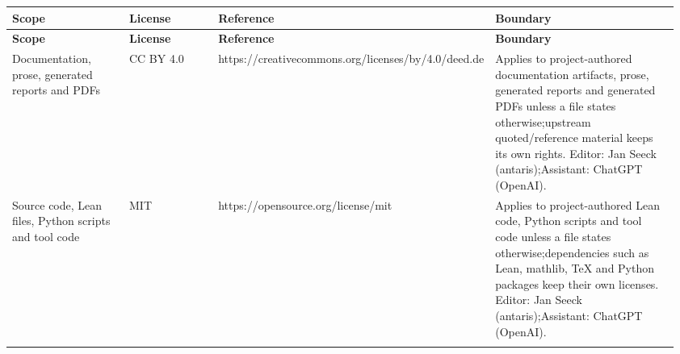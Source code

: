 \footnotesize
{}
\begin{longtable}{L{0.21\linewidth} L{0.185\linewidth} L{0.22\linewidth} L{0.35\linewidth}}
\hline
\textbf{Scope} & \textbf{License} & \textbf{Reference} & \textbf{Boundary}\\
\hline
\endfirsthead
\hline
\textbf{Scope} & \textbf{License} & \textbf{Reference} & \textbf{Boundary}\\
\hline
\endhead
Documentation, prose, generated reports and PDFs & CC BY 4.0 & https:/\allowbreak{}/\allowbreak{}creativecommons.org/\allowbreak{}licenses/\allowbreak{}by/\allowbreak{}4.0/\allowbreak{}deed.de & Applies to project-authored documentation artifacts, prose, generated reports and generated PDFs unless a file states otherwise;\newline upstream quoted/\allowbreak{}reference material keeps its own rights. Editor: Jan Seeck (antaris);\newline Assistant: ChatGPT (OpenAI).\\
\hline
\addlinespace[0.24em]
Source code, Lean files, Python scripts and tool code & MIT & https:/\allowbreak{}/\allowbreak{}opensource.org/\allowbreak{}license/\allowbreak{}mit & Applies to project-authored Lean code, Python scripts and tool code unless a file states otherwise;\newline dependencies such as Lean, mathlib, TeX and Python packages keep their own licenses. Editor: Jan Seeck (antaris);\newline Assistant: ChatGPT (OpenAI).\\
\hline
\addlinespace[0.24em]
\end{longtable}
\normalsize
